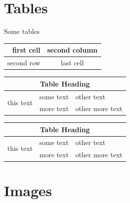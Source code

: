\documentclass[12pt,twoside,a4paper]{article}
\begin{document}
\lipsum[5-6]

\section{Tables}

Some tables

\vspace{0.2in}

\begin{tabular}{| r | c |}
\hline
first cell & second column \\
\hline
second row & last cell \\
\hline
\end{tabular}

\vspace{0.2in}




\vspace{0.2in}

\begin{tabular}{ | r | c | l | }
    \hline
    \multicolumn{3}{|c|}{Table Heading} \\
\hline
    \multirow{2}{*}{this text} & some text & other text \\
     & more text & other more text \\
    \hline
\end{tabular}

\vspace{0.2in}

\begin{tabularx}{\textwidth}{ | X | X | X | }
    \hline
    \multicolumn{3}{|c|}{Table Heading} \\
\hline
    \multirow{2}{*}{this text} & some text & other text \\
     & more text & other more text \\
    \hline
\end{tabularx}

\section{Images}

\setlength\fboxrule{6pt}
\setlength\fboxsep{0pt}
\end{document}
